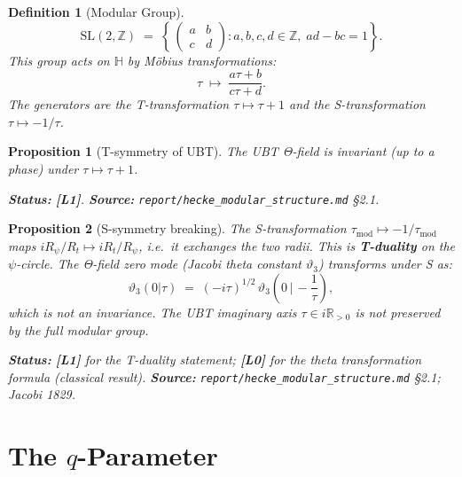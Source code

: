 \documentclass[11pt,a4paper]{article}
\newtheorem{proposition}{Proposition}
\newtheorem{definition}{Definition}
\begin{document}
\begin{definition}[Modular Group]
\begin{equation}
  \mathrm{SL}(2,\mathbb{Z}) \;=\; \left\{\, \begin{pmatrix} a & b \\ c & d \end{pmatrix} :
    a,b,c,d \in \mathbb{Z},\; ad - bc = 1 \right\}.
\end{equation}
This group acts on $\mathbb{H}$ by Möbius transformations:
\begin{equation}
  \tau \;\mapsto\; \frac{a\tau + b}{c\tau + d}.
\end{equation}
The generators are the T-transformation $\tau \mapsto \tau + 1$ and the
S-transformation $\tau \mapsto -1/\tau$.
\end{definition}

\begin{proposition}[T-symmetry of UBT]\label{prop:T_sym}
The UBT Θ-field is invariant (up to a phase) under $\tau \mapsto \tau + 1$.

\noindent\textbf{Status:} \textbf{[L1]}.
\noindent\textbf{Source:} \texttt{report/hecke\_modular\_structure.md} §2.1.
\end{proposition}

\begin{proposition}[S-symmetry breaking]\label{prop:S_break}
The S-transformation $\tau_{\mathrm{mod}} \mapsto -1/\tau_{\mathrm{mod}}$ maps
$iR_\psi/R_t \mapsto iR_t/R_\psi$, i.e.\ it exchanges the two radii.
This is \textbf{T-duality} on the $\psi$-circle. The Θ-field zero mode
(Jacobi theta constant $\vartheta_3$) transforms under S as:
\begin{equation}
  \vartheta_3(0|\tau) \;=\; (-i\tau)^{1/2}\,\vartheta_3\!\left(0\,\Big|\,-\frac{1}{\tau}\right),
\end{equation}
which is \emph{not} an invariance. The UBT imaginary axis $\tau \in i\mathbb{R}_{>0}$
is not preserved by the full modular group.

\noindent\textbf{Status:} \textbf{[L1]} for the T-duality statement;
\textbf{[L0]} for the theta transformation formula (classical result).
\noindent\textbf{Source:} \texttt{report/hecke\_modular\_structure.md} §2.1;
Jacobi 1829.
\end{proposition}

\section{The $q$-Parameter}
\label{sec:q_parameter}
\end{document}
